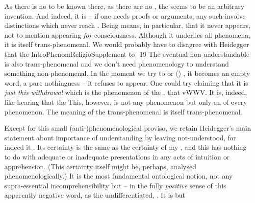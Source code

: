 \pa As there is no  to be known there, as there are no
, the  seems to be an arbitrary invention. And indeed,
it is -- if
one needs proofs or arguments; any such involve distinctions which never reach
.  Being  means, in particular, that it never appears,
not to mention appearing {\em for} consciousness. Although it underlies all
phenomena, it is itself trans-phenomenal. We would probably have to disagree
with Heidegger that the \citet{specific element of phenomenological understanding
  is that it is capable of understanding something non-understandable, exactly
  when it radically leaves it in its
  non-understandability.}{IntroPhenomReligio}{Supplement to -19}
 The eventual non-understandable is also trans-phenomenal and we don't
need phenomenology to understand
something non-phenomenal.
%
In the moment we try to  or  () ,
it becomes an 
empty word, a pure nothingness -- it refuses to appear. One could try claiming
that it is {\em just this withdrawal} which is the phenomenon of the , that
\citet{exactly when the Letting-be in a particular way lets a being to which
it relates be, and hence unveils it, it veils being in general.}{vWW}{V.  It is, indeed, like hearing that the }
This, however, is not any phenomenon but only an  of every
phenomenon. 
The meaning of the trans-phenomenal is itself trans-phenomenal.

Except for this small (anti-)phenomenological proviso, we retain
Heidegger's  main statement about importance of understanding by leaving
not-understood, for indeed it
. 
Its certainty is the same as the certainty of my , and this has
nothing to do with adequate or inadequate presentations in any acts of intuition
or apprehension. (This certainty itself might be, perhaps, analysed
phenomenologically.)  It is the most fundamental ontological notion, not any
supra-essential incomprehensibility but  -- in the fully {\em
  positive} sense of this apparently negative word, as the undifferentiated,
.  It is  but 

